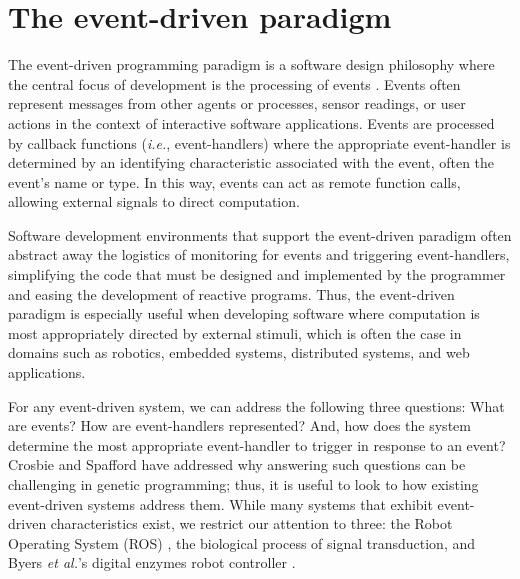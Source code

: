 \section{The event-driven paradigm}

The event-driven programming paradigm is a software design philosophy where the central focus of development is the processing of events
\citep{etzion_event_2010,heemels_introduction_2012,cassandras_event-driven_2014}. 
Events often represent messages from other agents or processes, sensor readings, or user actions in the context of interactive software applications. 
Events are processed by callback functions (\textit{i.e.}, event-handlers) where the appropriate event-handler is determined by an identifying characteristic associated with the event, often the event's name or type. 
In this way, events can act as remote function calls, allowing external signals to direct computation. 

Software development environments that support the event-driven paradigm often abstract away the logistics of monitoring for events and triggering event-handlers, simplifying the code that must be designed and implemented by the programmer and easing the development of reactive programs.
Thus, the event-driven paradigm is especially useful when developing software where computation is most appropriately directed by external stimuli, which is often the case in domains such as robotics, embedded systems, distributed systems, and web applications. 

For any event-driven system, we can address the following three questions: 
What are events? 
How are event-handlers represented? 
And, how does the system determine the most appropriate event-handler to trigger in response to an event? 
Crosbie and Spafford \citep{crosbie_evolving_1996} have addressed why answering such questions can be challenging in genetic programming; thus, it is useful to look to how existing event-driven systems address them.
While many systems that exhibit event-driven characteristics exist, we restrict our attention to three: 
the Robot Operating System (ROS) \citep{quigley_ros:_2009}, 
the biological process of signal transduction, 
and Byers \textit{et al.}'s digital enzymes robot controller \citep{byers_digital_2011,byers_exploring_2012}. 

